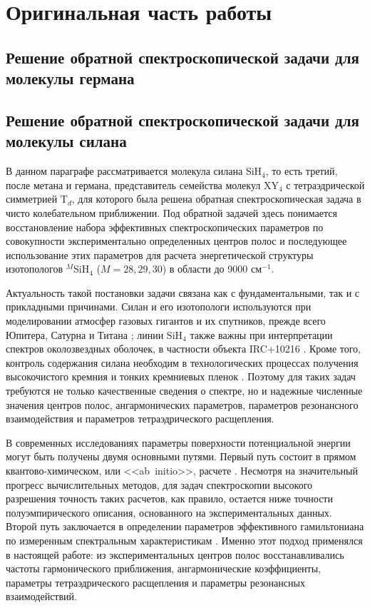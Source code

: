 \chapter{Оригинальная часть работы}\label{ch:original}

\section{Решение обратной спектроскопической задачи для молекулы германа}\label{sec:ch2/Ge}

\section{Решение обратной спектроскопической задачи для молекулы силана}\label{sec:ch2/Si}

В данном параграфе рассматривается молекула силана SiH$_4$, то есть третий, после метана и германа,
представитель семейства молекул XY$_4$ с тетраэдрической симметрией T$_d$, для которого была решена
обратная спектроскопическая задача в чисто колебательном приближении. Под обратной задачей здесь
понимается восстановление набора эффективных спектроскопических параметров по совокупности
экспериментально определенных центров полос и последующее использование этих параметров для
расчета энергетической структуры изотопологов ${}^{M}$SiH$_4$ ($M=28,29,30$) в области до
9000 см$^{-1}$.

Актуальность такой постановки задачи связана как с фундаментальными, так и с прикладными
причинами. Силан и его изотопологи используются при моделировании атмосфер газовых гигантов и их
спутников, прежде всего Юпитера, Сатурна и Титана \cite{003,004,005,006,007,008,009}; линии SiH$_4$
также важны при интерпретации спектров околозвездных оболочек, в частности объекта IRC+10216
\cite{010,011,012}. Кроме того, контроль содержания силана необходим в технологических процессах
получения высокочистого кремния и тонких кремниевых пленок \cite{001,002}. Поэтому для таких задач
требуются не только качественные сведения о спектре, но и надежные численные значения центров полос,
ангармонических параметров, параметров резонансного взаимодействия и параметров тетраэдрического
расщепления.

В современных исследованиях параметры поверхности потенциальной энергии могут быть получены двумя
основными путями. Первый путь состоит в прямом квантово-химическом, или <<ab~initio>>, расчете
\cite{abinitio_1,abinitio_3,abinitio_5,abinitio_6,abinitio_8,abinitio_9,abinitio_10,abinitio_11}. Несмотря на
значительный прогресс вычислительных методов, для задач спектроскопии высокого разрешения точность
таких расчетов, как правило, остается ниже точности полуэмпирического описания, основанного на
экспериментальных данных. Второй путь заключается в определении параметров эффективного
гамильтониана по измеренным спектральным характеристикам \cite{kuchitsu,nielsen,locmode,MWour}. Именно
этот подход применялся в настоящей работе: из экспериментальных центров полос восстанавливались
частоты гармонического приближения, ангармонические коэффициенты, параметры тетраэдрического
расщепления и параметры резонансных взаимодействий.

